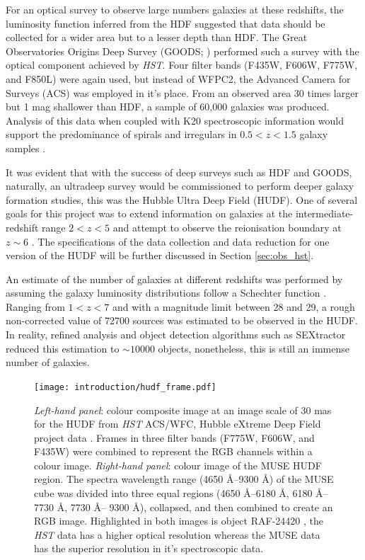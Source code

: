 \documentclass[12pt, twocolumn, nofootinbib]{revtex4-1}    %
\begin{document}
For an optical survey to observe large numbers galaxies at these redshifts, the luminosity function inferred from the HDF suggested that data should be collected for a wider area but to a lesser depth than HDF. The Great Observatories Origins Deep Survey (GOODS; \citealt{2004ApJ...600L..93G}) performed such a survey with the optical component achieved by \textit{HST}. Four filter bands (F435W, F606W, F775W, and F850L) were again used, but instead of WFPC2, the Advanced Camera for Surveys (ACS) was employed in it's place. From an observed area 30 times larger but 1 mag shallower than HDF, a sample of 60,000 galaxies was produced. Analysis of this data when coupled with K20 spectroscopic information would support the predominance of spirals and irregulars in $0.5<z<1.5$ galaxy samples \citep{2005MNRAS.357..903C}.

It was evident that with the success of deep surveys such as HDF and GOODS, naturally, an ultradeep survey would be commissioned to perform deeper galaxy formation studies, this was the Hubble Ultra Deep Field (HUDF). One of several goals for this project was to extend information on galaxies at the intermediate-redshift range $2<z<5$ and attempt to observe the reionisation boundary at $z\sim6$ \citep{2006AJ....132.1729B}. The specifications of the data collection and data reduction for one version of the HUDF will be further discussed in Section \ref{sec:obs_hst}.

An estimate of the number of galaxies at different redshifts was performed by assuming the galaxy luminosity distributions follow a Schechter function \citep{1976ApJ...203..297S}. Ranging from $1<z<7$ and with a magnitude limit between 28 and 29, a rough non-corrected value of 72700 sources was estimated to be observed in the HUDF. In reality, refined analysis and object detection algorithms such as SEXtractor \citep{1996A&AS..117..393B} reduced this estimation to $\sim10000$ objects, nonetheless, this is still an immense number of galaxies. 

\begin{figure}
\texttt{[image: introduction/hudf\_frame.pdf]}
\caption[Hubble Ultra Deep Field]{\textit{Left-hand panel}: colour composite image at an image scale of 30 mas for the HUDF from \textit{HST} ACS/WFC, Hubble eXtreme Deep Field project data \citep{2013ApJS..209....6I}. Frames in three filter bands (F775W, F606W, and F435W) were combined to represent the RGB channels within a colour image. \textit{Right-hand panel}: colour image of the MUSE HUDF region. The spectra wavelength range (4650 \AA--9300 \AA) of the MUSE cube was divided into three equal regions (4650 \AA--6180 \AA, 6180 \AA--7730 \AA, 7730 \AA -- 9300 \AA), collapsed, and then combined to create an RGB image. Highlighted in both images is object RAF-24420 \citep{2015AJ....150...31R}, the \textit{HST} data has a higher optical resolution whereas the MUSE data has the superior resolution in it's spectroscopic data.}
\label{fig:hst_muse_hdf}
\end{figure}
\end{document}
